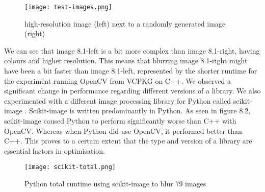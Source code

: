 \begin{figure}[H]
	\centering
	\texttt{[image: test-images.png]}
	\caption{high-resolution image (left) next to a randomly generated image (right)}
	\label{figure:test-images}
\end{figure}

We can see that image 8.1-left is a bit more complex than image 8.1-right, having colours and higher resolution. This means that blurring image 8.1-right might have been a bit faster than image 8.1-left, represented by the shorter runtime for the experiment running OpenCV from VCPKG on C++.
We observed a significant change in performance regarding different versions of a library. We also experimented with a different image processing library for Python called scikit-image \cite{scikit}. Scikit-image is written predominantly in Python. As seen in figure 8.2, scikit-image caused Python to perform significantly worse than C++ with OpenCV. Whereas when Python did use OpenCV, it performed better than C++. This proves to a certain extent that the type and version of a library are essential factors in optimisation.

\begin{figure}[H]
	\centering
	\texttt{[image: scikit-total.png]}
	\caption{Python total runtime using scikit-image to blur 79 images}
	\label{figure:scikit-total}
\end{figure}

